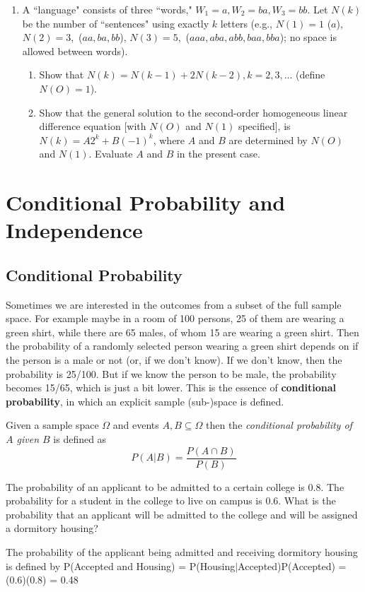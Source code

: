 \documentclass[../main.tex]{subfiles}
\begin{document}
{\begin{enumerate}
	\item  A ``language" consists of three ``words," 
	$W_1 =a, W_2 = ba, W_3 = bb$. Let
	$N(k)$ be the number of ``sentences" using exactly $k$ letters (e.g., $N(1) = 1$ ($a$), $N(2) = 3,$ ($aa, ba, bb$), $N(3) =5,$ ($aaa, aba, abb, baa, bba$); no space is
	allowed between words).
	\begin{enumerate}
	\item Show that $N(k) = N(k - 1) + 2N(k - 2), k =2,3,...$ (define $N(O) =1$).
	\item Show that the general solution to the second-order homogeneous linear
	difference equation 
	[with $N(O)$ and $N(1)$ specified], is $N(k) = A2^k +
	B(-1)^k$, where $A$ and $B$ are determined by $N(O)$ and $N(1)$. Evaluate $A$
	and $B$ in the present case.
	\end{enumerate}	
\end{enumerate}
}

\section{Conditional Probability and Independence}
\subsection{Conditional Probability}
Sometimes we are interested in the outcomes from a subset of the full sample space. 
For example maybe in a room of 100 persons, 25 of them are wearing a green shirt, while there are 65 males, of whom 15 are wearing a green shirt. Then the probability of a
randomly selected person wearing a green shirt depends on if the person is a male or not (or, if we don't know). If we don't know, then the probability is 25/100. But if
we know the person to be male, the probability becomes 15/65, which is just a bit lower.
This is the essence of \textbf{conditional probability}, in which an explicit sample (sub-)space is defined.

\begin{definition}
	Given a sample space $\Omega$ and events  $A,B \subseteq \Omega$ then
	the  \textit{conditional probability of $A$ given $B$} is defined as
	\begin{equation}
	P(A | B) = \dfrac{P(A \cap B)}{P(B)}
	\end{equation}
	\label{def:condprob}
\end{definition}

\begin{example}
	The probability of an applicant to be admitted to a certain college is 0.8.
	The probability for a student in the college to live on campus is 0.6. What
	is the probability that an applicant will be admitted to the college and will
	be assigned a dormitory housing?
\end{example}
\begin{solution}
	The probability of the applicant being admitted and receiving dormitory
	housing is defined by
	P(Accepted and Housing) = P(Housing$|$Accepted)P(Accepted)
	= (0.6)(0.8) = 0.48
\end{solution}
\end{document}
